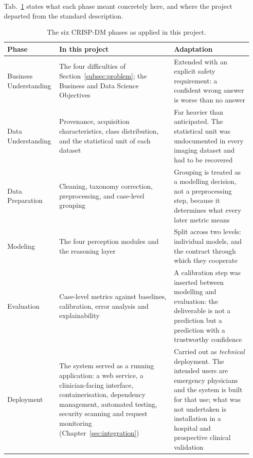 Tab.~\ref{tab:crispdm} states what each phase meant concretely here, and where the project
departed from the standard description.

\begin{table}[H]
  \centering
  \small
  \begin{tabularx}{\linewidth}{lXX}
    \toprule
    \textbf{Phase} & \textbf{In this project} & \textbf{Adaptation} \\
    \midrule
    Business Understanding & The four difficulties of
      Section~\ref{subsec:problem}; the Business and Data Science Objectives &
      Extended with an explicit safety requirement: a confident wrong answer is worse
      than no answer \\
    \addlinespace[2pt]
    Data Understanding & Provenance, acquisition characteristics, class distribution, and
      the statistical unit of each dataset &
      Far heavier than anticipated. The statistical unit was undocumented in every imaging
      dataset and had to be recovered \\
    \addlinespace[2pt]
    Data Preparation & Cleaning, taxonomy correction, preprocessing, and case-level
      grouping &
      Grouping is treated as a modelling decision, not a preprocessing step, because it
      determines what every later metric means \\
    \addlinespace[2pt]
    Modeling & The four perception modules and the reasoning layer &
      Split across two levels: individual models, and the contract through which they
      cooperate \\
    \addlinespace[2pt]
    Evaluation & Case-level metrics against baselines, calibration, error analysis and
      explainability &
      A calibration step was inserted between modelling and evaluation: the deliverable is
      not a prediction but a prediction with a trustworthy confidence \\
    \addlinespace[2pt]
    Deployment & The system served as a running application: a web service, a clinician-facing
      interface, containerisation, dependency management, automated testing, security scanning
      and request monitoring (Chapter~\ref{sec:integration}) &
      Carried out as \emph{technical} deployment. The intended users are emergency physicians
      and the system is built for that use; what was not undertaken is installation in a
      hospital and prospective clinical validation \\
    \bottomrule
  \end{tabularx}
  \caption{The six CRISP-DM phases as applied in this project.}
  \label{tab:crispdm}
\end{table}

